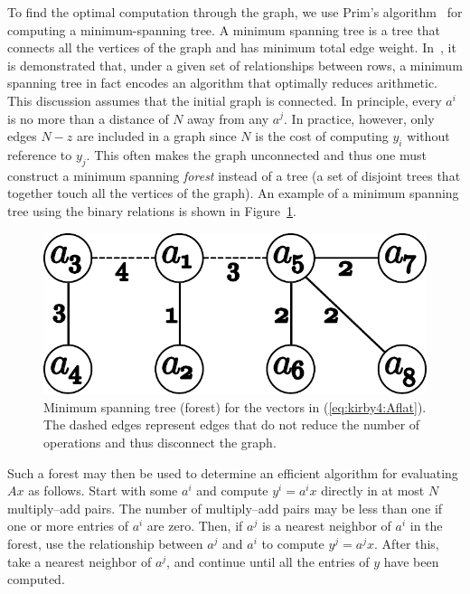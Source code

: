 To find the optimal computation through the graph, we use Prim's
algorithm~\cite{prim} for computing a minimum-spanning tree. A minimum
spanning tree is a tree that connects all the vertices of the graph
and has minimum total edge weight. In~\cite{KirEtAl2006}, it is
demonstrated that, under a given set of relationships between rows, a
minimum spanning tree in fact encodes an algorithm that optimally
reduces arithmetic.  This discussion assumes that the initial graph is
connected. In principle, every \( a^i \) is no more than a distance
of \( N \) away from any \( a^j \). In practice, however, only
edges \( N - z \) are included in a graph since $N$ is the cost of
computing \( y_i \) without reference to \( y_j \). This often makes
the graph unconnected and thus one must construct a minimum
spanning \emph{forest} instead of a tree (a set of disjoint trees that
together touch all the vertices of the graph). An example of a minimum
spanning tree using the binary relations is shown in
Figure~\ref{fig:kirby4:mst}.

\begin{figure}
  \begin{center}
   \includegraphics[width=\smallwidth]{chapters/kirby-4/pdf/small_mst.pdf}
    \caption{Minimum spanning tree (forest) for the vectors in
      (\ref{eq:kirby4:Aflat}). The dashed edges represent edges that do
    not reduce the number of operations and thus disconnect the graph.}
    \label{fig:kirby4:mst}
  \end{center}
\end{figure}

Such a forest may then be used to determine an efficient algorithm for
evaluating \( A x \) as follows. Start with some \( a^i \) and
compute \( y^i = a^i x \) directly in at most \( N \) multiply--add
pairs. The number of multiply--add pairs may be less than one if one
or more entries of $a^i$ are zero. Then, if \( a^j \) is a nearest
neighbor of \( a^i \) in the forest, use the relationship between \(
a^j \) and \( a^i \) to compute \( y^j = a^j x \).  After this, take a
nearest neighbor of \( a^j \), and continue until all the entries of
\( y \) have been computed.

